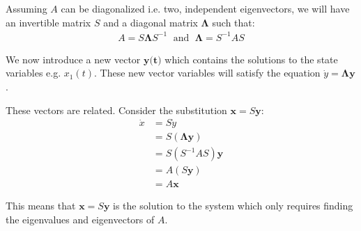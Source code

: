 \documentclass[10pt,a4paper]{article}
\begin{document}
Assuming $A$ can be diagonalized i.e. two, independent eigenvectors, we will have an invertible
matrix $S$ and a diagonal matrix $\mathbf{\Lambda}$ such that:
\begin{align*}
    A = S \mathbf{\Lambda} S^{-1} \; \text{ and } \; \mathbf{\Lambda} = S^{-1}AS
\end{align*}

We now introduce a new vector $\textbf{y(t)}$ which contains the solutions to the state variables e.g.
$x_1(t)$. These new vector variables will satisfy the equation $\dot{y} = \mathbf{\Lambda}
\textbf{y}$. 

These vectors are related. Consider the substitution $\textbf{x} = S \textbf{y}$: 
\begin{align*}
    \dot{x} &= S\dot{y} \\
    &= S(\mathbf{\Lambda} \textbf{y}) \\
    &= S(S^{-1}AS)\textbf{y} \\
    &= A(S \textbf{y}) \\
    &= A \textbf{x}
\end{align*}

This means that $\textbf{x} = S \textbf{y}$ is the solution to the system which only requires
finding the eigenvalues and eigenvectors of $A$.

\pagebreak
\end{document}
